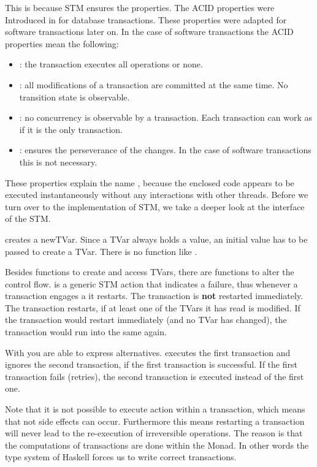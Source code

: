 This is because STM ensures the  properties. The ACID properties were Introduced in \parencite{DBTrans} for
database transactions. These properties were adapted for software transactions later on.
In the case of software transactions the ACID properties mean the following:
\begin{itemize}
 \item {}: the transaction executes all operations or none.
 \item {}: all modifications of a transaction are committed at the same time. No transition state is observable.
 \item {}: no concurrency is observable by a transaction. Each transaction can work as if it is the only transaction.
 \item {}: ensures the perseverance of the changes. In the case of software transactions this is not necessary.
\end{itemize}
These properties explain the name , because the enclosed code appears to be executed instantaneously without any 
interactions with other threads.
Before we turn over to the implementation of STM, we take a deeper look at the interface of the STM.

 creates a newTVar. Since a TVar always holds a value, an initial value has to be
passed to create a TVar. There is no function like . 

Besides functions to create and access TVars, there are functions to alter the control flow.
 is a generic STM action that indicates a failure, thus whenever a transaction engages a  it restarts. The transaction
is \textbf{not} restarted immediately. The transaction restarts, if at least one of the TVars it has read is modified. If the transaction would
restart immediately (and no TVar has changed), the transaction would run into the same  again. 

With  you are able to express alternatives.  executes the first transaction
and ignores the second transaction, if the first transaction is successful. If the first transaction fails (retries), the second transaction is 
executed instead of the first one.

Note that it is not possible to execute  action within a transaction, which means that not side effects can occur. Furthermore this means
restarting a transaction will never lead to the re-execution of irreversible operations. The reason is that the computations of transactions
are done within the  Monad. In other words the type system of Haskell forces us to write correct transactions. 

